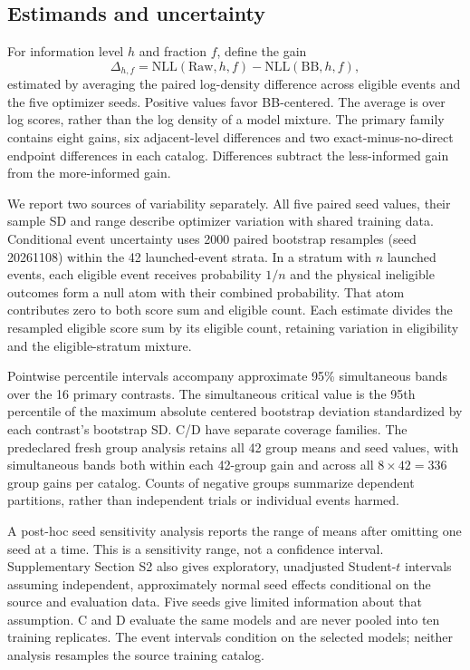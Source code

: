 \documentclass[11pt]{article}
\newcommand{\raw}{\mathrm{Raw}}
\begin{document}
\subsection{Estimands and uncertainty}
\label{sec:information_uncertainty}

For information level $h$ and fraction $f$, define the gain
\begin{equation}
 \Delta_{h,f}=\mathrm{NLL}(\raw,h,f)-\mathrm{NLL}(\mathrm{BB},h,f),
 \label{eq:contrast}
\end{equation}
estimated by averaging the paired log-density difference across eligible
events and the five optimizer seeds. Positive values favor BB-centered.
The average is over log scores, rather than the log density of a model mixture.
The primary family contains eight gains, six adjacent-level differences and
two exact-minus-no-direct endpoint differences in each catalog. Differences
subtract the less-informed gain from the more-informed gain.

We report two sources of variability separately. All five paired seed values,
their sample SD and range describe optimizer variation with shared training
data. Conditional event uncertainty uses 2000 paired bootstrap resamples
(seed 20261108) within the 42 launched-event strata. In a stratum with $n$
launched events, each eligible event receives probability $1/n$ and the
physical ineligible outcomes form a null atom with their combined probability.
That atom contributes zero to both score sum and eligible count. Each estimate
divides the resampled eligible score sum by its eligible count, retaining
variation in eligibility and the eligible-stratum mixture.

Pointwise percentile intervals accompany approximate 95\% simultaneous bands
over the 16 primary contrasts. The simultaneous critical value is the 95th
percentile of the maximum absolute centered bootstrap deviation standardized
by each contrast's bootstrap SD. C/D have separate coverage families.
The predeclared fresh group analysis retains all 42 group means and seed
values, with simultaneous bands both within each 42-group gain and across
all $8\times42=336$ group gains per catalog. Counts of negative groups
summarize dependent partitions, rather than independent trials or individual
events harmed.

A post-hoc seed sensitivity analysis reports the range of means after omitting
one seed at a time. This is a sensitivity range, not a confidence interval.
Supplementary Section S2 also gives exploratory, unadjusted Student-$t$
intervals assuming independent, approximately normal seed effects conditional
on the source and evaluation data. Five seeds give limited information about
that assumption. C and D evaluate the same models and are never pooled into
ten training replicates. The event intervals condition on the selected models;
neither analysis resamples the source training catalog.
\end{document}
